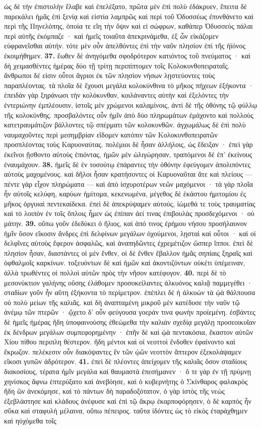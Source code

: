 \documentclass[a4paper, 11pt, oneside, polutonikogreek, german]{article}
\begin{document}
ὡς δὲ τὴν ἐπιστολὴν ἔλαβε καὶ ἐπελέξατο, πρῶτα μὲν ἐπὶ πολὺ ἐδάκρυεν, ἔπειτα δὲ παρεκάλει ἡμᾶς ἐπὶ ξενίᾳ καὶ εἱστία λαμπρῶς καὶ περὶ τοῦ Ὀδυσσέως ἐπυνθάνετο καὶ περὶ τῆς Πηνελόπης, ὁποία τε εἴη τὴν ὄψιν καὶ εἰ σώφρων, καθάπερ Ὀδυσσεὺς πάλαι περὶ αὐτῆς ἐκόμπαζε · καὶ ἡμεῖς τοιαῦτα ἀπεκρινάμεθα, ἐξ ὧν εἰκάζομεν εὐφρανεῖσθαι αὐτήν. τότε μὲν οὖν ἀπελθόντες ἐπὶ τὴν ναῦν πλησίον ἐπὶ τῆς ἠϊόνος ἐκοιμήθημεν. \textbf{37.} ἕωθεν δὲ ἀνηγόμεθα σφοδρότερον κατιόντος τοῦ πνεύματος · καὶ δὴ χειμασθέντες ἡμέρας δύο τῇ τρίτῃ περιπίπτομεν τοῖς Κολοκυνθοπειραταῖς. ἄνθρωποι δέ εἰσιν οὗτοι ἄγριοι ἐκ τῶν πλησίον νήσων λῃστεύοντες τοὺς παραπλέοντας. τὰ πλοῖα δὲ ἔχουσι μεγάλα κολοκύνθινα τὸ μῆκος πήχεων ἑξήκοντα · ἐπειδὰν γὰρ ξηράνωσι τὴν κολόκυνθαν, κοιλάναντες αὐτὴν καὶ ἐξελόντες τὴν ἐντεριώνην ἐμπλέουσιν, ἱστοῖς μὲν χρώμενοι καλαμίνοις, ἀντὶ δὲ τῆς ὀθόνης τῷ φύλλῳ τῆς κολοκύνθης. προσβαλόντες οὖν ἡμῖν ἀπὸ δύο πληρωμάτων ἐμάχοντο καὶ πολλοὺς κατετραυμάτιζον βάλλοντες τῷ σπέρματι τῶν κολοκυνθῶν. ἀγχωμάλως δὲ ἐπὶ πολὺ ναυμαχοῦντες περὶ μεσημβρίαν εἴδομεν κατόπιν τῶν Κολοκυνθοπειρατῶν προσπλέοντας τοὺς Καρυοναύτας. πολέμιοι δὲ ἦσαν ἀλλήλοις, ὡς ἔδειξαν · ἐπεὶ γὰρ ἐκεῖνοι ᾔσθοντο αὐτοὺς ἐπιόντας, ἡμῶν μὲν ὠλιγώρησαν, τραπόμενοι δὲ ἐπ' ἐκείνους ἐναυμάχουν. \textbf{38.} ἡμεῖς δὲ ἐν τοσούτῳ ἐπάραντες τὴν ὀθόνην ἐφεύγομεν ἀπολιπόντες αὐτοὺς μαχομένους. καὶ δῆλοι ἦσαν κρατήσοντες οἱ Καρυοναῦται ἅτε καὶ πλείους --- πέντε γὰρ εἶχον πληρώματα --- καὶ ἀπὸ ἰσχυροτέρων νεῶν μαχόμενοι · τὰ γὰρ πλοῖα ἦν αὐτοῖς κελύφη, καρύων ἡμίτομα, κεκενωμένα, μέγεθος δὲ ἑκάστου ἡμιτομίου ἐς μῆκος ὀργυιαὶ πεντεκαίδεκα. ἐπεὶ δὲ ἀπεκρύψαμεν αὐτούς, ἰώμεθά τε τοὺς τραυματίας καὶ τὸ λοιπὸν ἐν τοῖς ὅπλοις ἦμεν ὡς ἐπίπαν ἀεί τινας ἐπιβουλὰς προσδεχόμενοι · οὐ μάτην. \textbf{39.} οὔπω γοῦν ἐδεδύκει ὁ ἥλιος, καὶ ἀπό τινος ἐρήμου νήσου προσήλαυνον ἡμῖν ὅσον εἴκοσιν ἄνδρες ἐπὶ δελφίνων μεγάλων ὀχούμενοι, λῃσταὶ καὶ οὗτοι · καὶ οἱ δελφῖνες αὐτοὺς ἔφερον ἀσφαλῶς, καὶ ἀναπηδῶντες ἐχρεμέτιζον ὥσπερ ἵπποι. ἐπεὶ δὲ πλησίον ἦσαν, διαστάντες οἱ μὲν ἔνθεν, οἱ δὲ ἔνθεν ἔβαλλον ἡμᾶς σηπίαις ξηραῖς καὶ ὀφθαλμοῖς καρκίνων. τοξευόντων δὲ καὶ ἡμῶν καὶ ἀκοντιζόντων οὐκέτι ὑπέμειναν, ἀλλὰ τρωθέντες οἱ πολλοὶ αὐτῶν πρὸς τὴν νῆσον κατέφυγον. \textbf{40.} περὶ δὲ τὸ μεσονύκτιον γαλήνης οὔσης ἐλάθομεν προσοκείλαντες ἀλκυόνος καλιᾷ παμμεγέθει · σταδίων γοῦν ἦν αὕτη ἑξήκοντα τὸ περίμετρον. ἐπέπλει δὲ ἡ ἀλκυὼν τὰ ᾠὰ θάλπουσα οὐ πολὺ μείων τῆς καλιᾶς. καὶ δὴ ἀναπταμένη μικροῦ μὲν κατέδυσε τὴν ναῦν τῷ ἀνέμῳ τῶν πτερῶν · ᾤχετο δ' οὖν φεύγουσα γοεράν τινα φωνὴν προϊεμένη. ἐσβάντες δὲ ἡμεῖς ἡμέρας ἤδη ὑποφαινούσης ἐθεώμεθα τὴν καλιὰν σχεδίᾳ μεγάλῃ προσεοικυῖαν ἐκ δένδρων μεγάλων συμπεφορημένην · ἐπῆν δὲ καὶ ᾠὰ πεντακόσια, ἕκαστον αὐτῶν Χίου πίθου περιπλη θέστερον. ἤδη μέντοι καὶ οἱ νεοττοὶ ἔνδοθεν ἐφαίνοντο καὶ ἔκρωζον. πελέκεσιν οὖν διακόψαντες ἓν τῶν ᾠῶν νεοττὸν ἄπτερον ἐξεκολάψαμεν εἴκοσι γυπῶν ἁδρότερον. \textbf{41.} ἐπεὶ δὲ πλέοντες ἀπείχομεν τῆς καλιᾶς ὅσον σταδίους διακοσίους, τέρατα ἡμῖν μεγάλα καὶ θαυμαστὰ ἐπεσήμανεν · ὅ τε γὰρ ἐν τῇ πρύμνῃ χηνίσκος ἄφνω ἐπτερύξατο καὶ ἀνεβόησε, καὶ ὁ κυβερνήτης ὁ Σκίνθαρος φαλακρὸς ἤδη ὢν ἀνεκόμησε, καὶ τὸ πάντων δὴ παραδοξότατον, ὁ γὰρ ἱστὸς τῆς νεὼς ἐξεβλάστησε καὶ κλάδους ἀνέφυσε καὶ ἐπὶ τῷ ἄκρῳ ἐκαρποφόρησεν, ὁ δὲ καρπὸς ἦν σῦκα καὶ σταφυλὴ μέλαινα, οὔπω πέπειρος. ταῦτα ἰδόντες ὡς τὸ εἰκὸς ἐταράχθημεν καὶ ηὐχόμεθα τοῖς 
\end{document}
